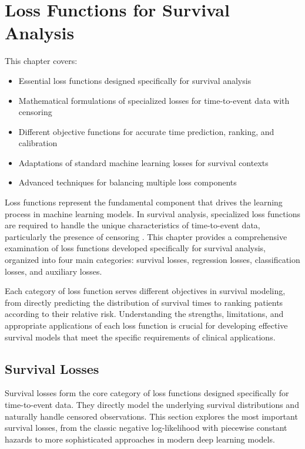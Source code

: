 \section{Loss Functions for Survival Analysis}

\begin{notebox}[title=Chapter Overview]
  This chapter covers:
  \begin{itemize}
  \item Essential loss functions designed specifically for survival analysis
  \item Mathematical formulations of specialized losses for time-to-event data with censoring
  \item Different objective functions for accurate time prediction, ranking, and calibration
  \item Adaptations of standard machine learning losses for survival contexts
  \item Advanced techniques for balancing multiple loss components
  \end{itemize}
\end{notebox}

Loss functions represent the fundamental component that drives the learning process in machine learning models. In survival analysis, specialized loss functions are required to handle the unique characteristics of time-to-event data, particularly the presence of censoring \parencite{lee2018,kvamme2019}. This chapter provides a comprehensive examination of loss functions developed specifically for survival analysis, organized into four main categories: survival losses, regression losses, classification losses, and auxiliary losses.

Each category of loss function serves different objectives in survival modeling, from directly predicting the distribution of survival times to ranking patients according to their relative risk. Understanding the strengths, limitations, and appropriate applications of each loss function is crucial for developing effective survival models that meet the specific requirements of clinical applications.

\subsection{Survival Losses}

Survival losses form the core category of loss functions designed specifically for time-to-event data. They directly model the underlying survival distributions and naturally handle censored observations. This section explores the most important survival losses, from the classic negative log-likelihood with piecewise constant hazards to more sophisticated approaches in modern deep learning models.


